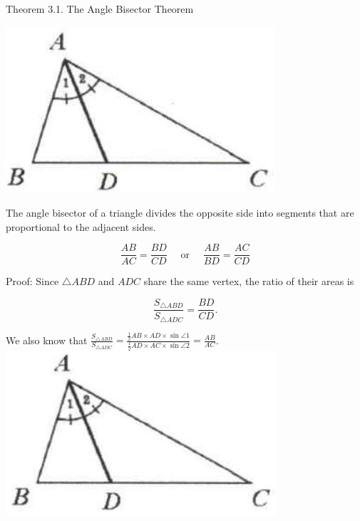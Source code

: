 \documentclass[10pt]{article}
\begin{document}
Theorem 3.1. The Angle Bisector Theorem
\begin{center}
\includegraphics[max width=\textwidth]{2025_04_17_97bc1f7e44d93c271a88g-053}
\end{center}

The angle bisector of a triangle divides the opposite side into segments that are proportional to the adjacent sides.

\[
\frac{A B}{A C}=\frac{B D}{C D} \quad \text { or } \quad \frac{A B}{B D}=\frac{A C}{C D}
\]

Proof:
Since \(\triangle A B D\) and \(A D C\) share the same vertex, the ratio of their areas is

\[
\frac{S_{\triangle A B D}}{S_{\triangle A D C}}=\frac{B D}{C D} .
\]

We also know that \(\frac{S_{\triangle A B D}}{S_{\triangle A D C}}=\frac{\frac{1}{2} A B \times A D \times \sin \angle 1}{\frac{1}{2} A D \times A C \times \sin \angle 2}=\frac{A B}{A C}\).\\
\includegraphics[max width=\textwidth, center]{2025_04_17_97bc1f7e44d93c271a88g-053(1)}
\end{document}
